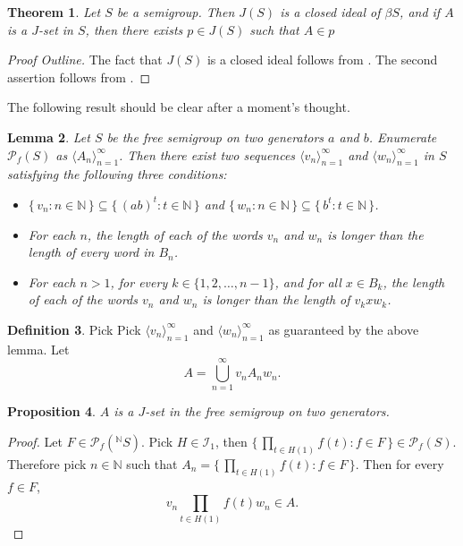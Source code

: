 \documentclass[12pt]{article}
\theoremstyle{plain}
\newtheorem{thm}{Theorem}[section]
\newtheorem{prop}[thm]{Proposition}
\newtheorem{lem}[thm]{Lemma}
\theoremstyle{definition}
\newtheorem{defn}[thm]{Definition}
\newcommand{\la}{\langle}
\newcommand{\ra}{\rangle}
\begin{document}
  \begin{thm}
  Let $S$ be a semigroup.
  Then $J(S)$ is a closed ideal of $\beta S$, and if $A$ is 
  a $J$-set in $S$, then there exists $p \in J(S)$ such that
  $A \in p$
  \end{thm}
  \begin{proof}[Proof Outline]
  The fact that $J(S)$ is a closed ideal follows from 
  \cite[Theorem 3.5]{NewCST}.
  The second assertion follows from \cite[Theorem 2.14]{CarProdCST}.
  \end{proof}

The following result should be clear after a moment's thought.

  \begin{lem}\label{lem:seqs}
  Let $S$ be the free semigroup on two generators $a$ and $b$.
  Enumerate $\mathcal{P}_f(S)$ as $\la A_n \ra_{n=1}^\infty$. 
   Then there exist two sequences $\la v_n \ra_{n=1}^\infty$ and 
  $\la w_n \ra_{n=1}^\infty$ in $S$ satisfying the following 
  three conditions:
    \begin{itemize}
    \item[(1)] $\{\, v_n : n \in \mathbb{N} \,\} \subseteq
      \{\, (ab)^t : t \in \mathbb{N} \,\}$ and $\{\, w_n :
      n \in \mathbb{N} \,\} \subseteq \{\, b^t : t \in \mathbb{N} 
      \,\}$.

    \item[(2)] For each $n$, the length of each of the words $v_n$ 
      and $w_n$ is longer than the length of every word in $B_n$.

    \item[(3)] For each $n > 1$, for every $k \in \{1, 2, \ldots,
      n-1\}$, and for all $x \in B_k$, the length of each of the 
      words $v_n$ and $w_n$ is longer than the length of 
      $v_kxw_k$.
    \end{itemize}
  \end{lem}

  \begin{defn}\label{jset}
  Pick Pick $\la v_n \ra_{n=1}^\infty$ and $\la w_n \ra_{n=1}^\infty$ as
  guaranteed by the above lemma. 
  Let
  \[ A = \bigcup_{n=1}^\infty v_nA_nw_n. \]
  \end{defn}

  \begin{prop}\label{prop:jset}
  $A$ is a $J$-set in the free semigroup on two generators.
  \end{prop}
  \begin{proof}
  Let $F \in \mathcal{P}_f(^{\mathbb{N}}{\!S})$.
  Pick $H \in \mathcal{I}_1$, then $\{\, \prod_{t \in H(1)} f(t) :
  f \in F \,\} \in \mathcal{P}_f(S)$.
  Therefore pick $n \in \mathbb{N}$ such that $A_n = \{\,
  \prod_{t \in H(1)} f(t) : f \in F \,\}$.
  Then for every $f \in F$,
  \[
  v_n\prod_{t \in H(1)} f(t)w_n \in A.
  \]
  \end{proof}
\end{document}
